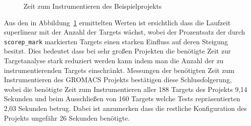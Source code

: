 \documentclass[german,proseminar,hyperref,utf8,lof]{zihpub}
\begin{document}
    \begin{figure}
        \begin{center}
            \caption{Zeit zum Instrumentieren des Beispielprojekts}
            \label{fig:runtime}
        \end{center}
    \end{figure}

    Aus den in Abbildung~\ref{fig:runtime} ermittelten Werten ist ersichtlich dass die Laufzeit superlinear
    mit der Anzahl der Targets wächst, wobei der Prozentsatz der durch \texttt{scorep\_mark} markierten Targets
    einen starken Einfluss auf deren Steigung besitzt.
    Dies bedeutet dass bei sehr gro{\ss}en Projekten die benötigte Zeit zur Targetanalyse stark reduziert
    werden kann indem man die Anzahl der zu instrumentierenden Targets einschränkt.
    Messungen der benötigten Zeit zum Instrumentieren des GROMACS Projekts bestätigen diese Schlussfolgerung,
    wobei die benötigte Zeit zum Instrumentieren aller 188 Targets des Projekts 9,14 Sekunden und beim
    Ausschlie{\ss}en von 160 Targets welche Tests repräsentierten 2,03 Sekunden betrug.
    Dabei ist anzumerken dass die restliche Konfiguration des Projekts ungefähr 26 Sekunden benötigte.
\end{document}
